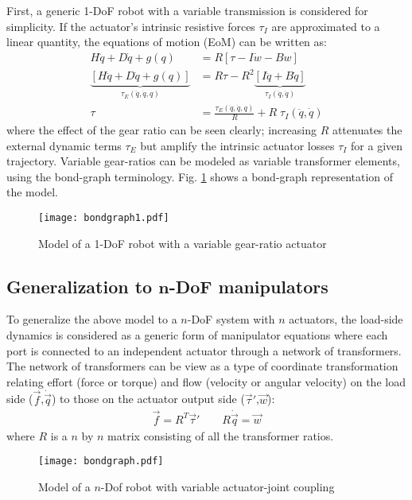 First, a generic 1-DoF robot with a variable transmission is considered for simplicity. If the actuator's intrinsic resistive forces $\tau_I$ are approximated to a linear quantity, the equations of motion (EoM) can be written as:
%
\begin{align}
  H \ddot{q} + D \dot{q} + g( q )	&= R  \left[ \tau - I \dot{w} - B w	\right] \\
	\underbrace{\left[	H \ddot{q} + D \dot{q} + g( q )	\right]}_{\tau_{E}(\ddot{q},\dot{q},q)}
	&= R \tau - R^2
	\underbrace{\left[ I \ddot{q} + B \dot{q}	\right]}_{\tau_{I}(\ddot{q},\dot{q})} \\
	\tau &= 	\frac{\tau_{E}(\ddot{q},\dot{q},q)}{R} + R \; \tau_{I}(\ddot{q},\dot{q})
	\label{eq:1dofEoM}
\end{align}
%
where the effect of the gear ratio can be seen clearly; increasing $R$ attenuates the external dynamic terms $\tau_{E}$ but amplify the intrinsic actuator losses $\tau_{I}$ for a given trajectory.
%
Variable gear-ratios can be modeled as variable transformer elements, using the bond-graph terminology. Fig. \ref{fig:bondgraph1} shows a bond-graph representation of the model.
\begin{figure}[htp]
	\centering
		\texttt{[image: bondgraph1.pdf]}
	\caption{Model of a 1-DoF robot with a variable gear-ratio actuator}
	\label{fig:bondgraph1}
\end{figure}


\subsection{Generalization to $\boldsymbol{n}$-DoF manipulators}
\label{sec:GeneralizationToNDOFManipulators}

To generalize the above model to a $n$-DoF system with $n$ actuators, the load-side dynamics is considered as a generic form of manipulator equations where each port is connected to an independent actuator through a network of transformers. The network of transformers can be view as a type of coordinate transformation relating effort (force or torque) and flow (velocity or angular velocity) on the load side ($\vec{f}$,$\dot{\vec{q}}$) to those on the actuator output side ($\vec{\tau}'$,$\vec{w}$):
%
\begin{align}
	\vec{ f } = R^T \vec{\tau}' \quad  \quad R \dot{ \vec{q} } = \vec{w}
 \label{eq:coortransform}
\end{align}
%
where $R$ is a $n$ by $n$ matrix consisting of all the transformer ratios. 
%
\begin{figure}[htp]
	\centering
		\texttt{[image: bondgraph.pdf]}
	\caption{Model of a $n$-Dof robot with variable actuator-joint coupling}
	\label{fig:bondgraph}
\end{figure}


